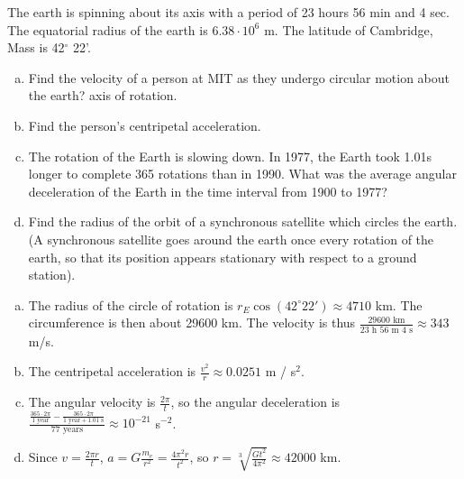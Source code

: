 \documentclass{esg8012pset}
\begin{document}
\begin{problem}[Problem 2.10]
  The earth is spinning about its axis with a period of 23 hours 56 min and 4 sec. The equatorial radius of the earth is $6.38\cdot 10^{6}$ m. The latitude of Cambridge, Mass is 42$^{\circ}$ 22'.
  \begin{enumerate}[a)]
    \item Find the velocity of a person at MIT as they undergo circular motion about the earth? axis of rotation.
    \item Find the person's centripetal acceleration.
    \item The rotation of the Earth is slowing down. In 1977, the Earth took 1.01s longer to complete 365 rotations than in 1990. What was the average angular deceleration of the Earth in the time interval from 1900 to 1977?
    \item Find the radius of the orbit of a synchronous satellite which circles the earth. (A synchronous satellite goes around the earth once every rotation of the earth, so that its position appears stationary with respect to a ground station).
  \end{enumerate}
\end{problem}
\begin{solution}
  \begin{enumerate}[a)]
    \item The radius of the circle of rotation is $r_E \cos(42^{\circ} 22') \approx 4710$ km.  The circumference is then about 29600 km.  The velocity is thus $\frac{29600\text{ km}}{23\text{ h }56\text{ m }4\text{ s}} \approx 343$ m/s.
    \item The centripetal acceleration is $\frac{v^2}{r} \approx 0.0251$ m / s$^2$.
    \item The angular velocity is $\frac{2\pi}{t}$, so the angular deceleration is $\frac{\frac{365\cdot 2\pi}{1\text{ year}} - \frac{365\cdot 2\pi}{1\text{ year}+1.01\text{ s}}}{77\text{ years}} \approx 10^{-21}$ s$^{-2}$. 
    \item Since $v = \frac{2\pi r}{t}$, $a = G\frac{m_e}{r^2} = \frac{4\pi^2 r}{t^2}$, so $r = \sqrt[3]{\frac{G t^2}{4\pi^2}} \approx 42000$ km.
  \end{enumerate}
\end{solution}
\end{document}
